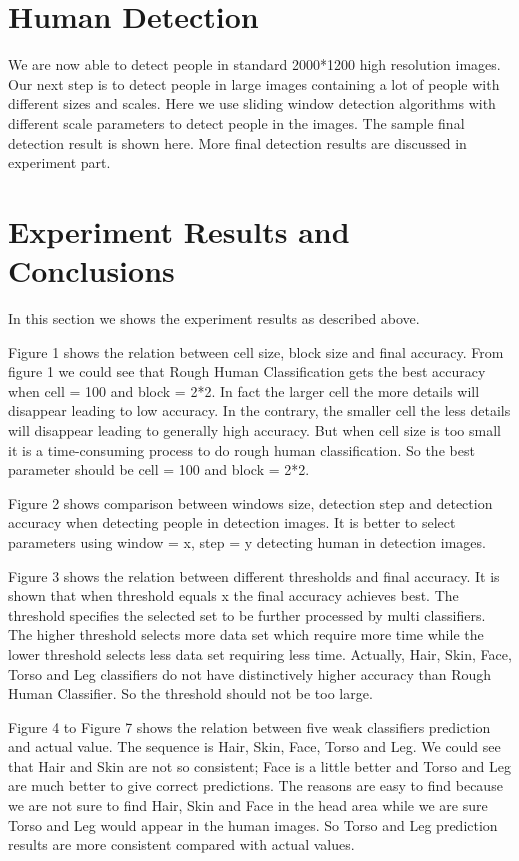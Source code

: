 \documentclass[10pt,twocolumn,letterpaper]{article}
\begin{document}
\section{Human Detection}
We are now able to detect people in standard 2000*1200 high resolution images. Our next step is to detect people in large images containing a lot of people with different sizes and scales. Here we use sliding window detection algorithms with different scale parameters to detect people in the images. The sample final detection result is shown here. More final detection results are discussed in experiment part.

\section{Experiment Results and Conclusions}
In this section we shows the experiment results as described above. 

Figure 1 shows the relation between cell size, block size and final accuracy. From figure 1 we could see that Rough Human Classification gets the best accuracy when cell = 100 and block = 2*2. In fact the larger cell the more details will disappear leading to low accuracy. In the contrary, the smaller cell the less details will disappear leading to generally high accuracy. But when cell size is too small it is a time-consuming process to do rough human classification. So the best parameter should be cell = 100 and block = 2*2.


 Figure 2 shows comparison between windows size, detection step and detection accuracy when detecting people in detection images. It is better to select parameters using window = x, step = y detecting human in detection images.

 Figure 3 shows the relation between
 different thresholds and final accuracy. It is shown that when threshold equals x the final accuracy achieves best. The threshold specifies the selected set
 to be further processed by multi classifiers. The higher threshold selects more data set which require more time while the lower threshold selects less data set requiring less time. Actually, Hair, Skin, Face, Torso and Leg classifiers do not have distinctively higher accuracy than Rough Human Classifier. So the threshold should not be too large.

 Figure 4 to Figure 7 shows the relation between five weak classifiers prediction and actual value. The sequence is Hair, Skin, Face, Torso and Leg. We could see that Hair and Skin are not so consistent; Face is a little better and Torso and Leg are much better to give correct predictions. The reasons are easy to find because we are not sure to find Hair, Skin and Face in the head area while we are sure Torso and Leg would appear in the human images. So Torso and Leg prediction results are more consistent compared with actual values.
\end{document}
